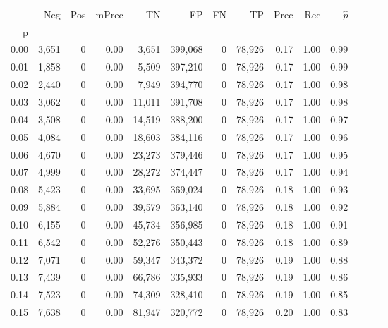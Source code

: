 \begin{tabular}{rrrrrrrrrrrrrr}
\toprule
{} &    Neg &    Pos & mPrec &       TN &       FP &      FN &      TP &  Prec &   Rec & $\hat{p}$ \\
p    &        &        &       &          &          &         &         &       &       &           \\
\midrule
0.00 &  3,651 &      0 &  0.00 &    3,651 &  399,068 &       0 &  78,926 &  0.17 &  1.00 &      0.99 \\
0.01 &  1,858 &      0 &  0.00 &    5,509 &  397,210 &       0 &  78,926 &  0.17 &  1.00 &      0.99 \\
0.02 &  2,440 &      0 &  0.00 &    7,949 &  394,770 &       0 &  78,926 &  0.17 &  1.00 &      0.98 \\
0.03 &  3,062 &      0 &  0.00 &   11,011 &  391,708 &       0 &  78,926 &  0.17 &  1.00 &      0.98 \\
0.04 &  3,508 &      0 &  0.00 &   14,519 &  388,200 &       0 &  78,926 &  0.17 &  1.00 &      0.97 \\
0.05 &  4,084 &      0 &  0.00 &   18,603 &  384,116 &       0 &  78,926 &  0.17 &  1.00 &      0.96 \\
0.06 &  4,670 &      0 &  0.00 &   23,273 &  379,446 &       0 &  78,926 &  0.17 &  1.00 &      0.95 \\
0.07 &  4,999 &      0 &  0.00 &   28,272 &  374,447 &       0 &  78,926 &  0.17 &  1.00 &      0.94 \\
0.08 &  5,423 &      0 &  0.00 &   33,695 &  369,024 &       0 &  78,926 &  0.18 &  1.00 &      0.93 \\
0.09 &  5,884 &      0 &  0.00 &   39,579 &  363,140 &       0 &  78,926 &  0.18 &  1.00 &      0.92 \\
0.10 &  6,155 &      0 &  0.00 &   45,734 &  356,985 &       0 &  78,926 &  0.18 &  1.00 &      0.91 \\
0.11 &  6,542 &      0 &  0.00 &   52,276 &  350,443 &       0 &  78,926 &  0.18 &  1.00 &      0.89 \\
0.12 &  7,071 &      0 &  0.00 &   59,347 &  343,372 &       0 &  78,926 &  0.19 &  1.00 &      0.88 \\
0.13 &  7,439 &      0 &  0.00 &   66,786 &  335,933 &       0 &  78,926 &  0.19 &  1.00 &      0.86 \\
0.14 &  7,523 &      0 &  0.00 &   74,309 &  328,410 &       0 &  78,926 &  0.19 &  1.00 &      0.85 \\
0.15 &  7,638 &      0 &  0.00 &   81,947 &  320,772 &       0 &  78,926 &  0.20 &  1.00 &      0.83 \\

\end{tabular}
